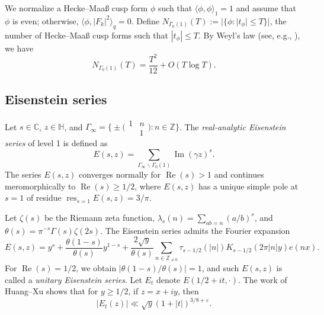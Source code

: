 \documentclass[12pt,reqno]{amsart}
\theoremstyle{remark}
\newcommand{\z}{\mathbb{Z}}
\newcommand{\bs}{\backslash}
\DeclareMathOperator{\Real}{Re}
\DeclareMathOperator{\Imag}{Im}
\DeclareMathOperator{\res}{res}
\numberwithin{equation}{section}
\begin{document}
    We normalize a Hecke--Maa{\ss} cusp form $\phi$ such that $\langle \phi, \phi \rangle_1= 1$ and assume that $\phi$ is  even; otherwise, $\langle \phi, |F_k|^2 \rangle_q = 0$. Define $N_{\Gamma_0(1)}(T) := |\{\phi :|t_\phi| \le T\}|$, the number of Hecke--Maa{\ss} cusp forms such that $|t_\phi| \le T$. By Weyl's law (see, e.g., \cite[Corollary 11.2]{Iw}), we have
        \begin{equation}
        \label{eq:Weyls}
            N_{\Gamma_0(1)}(T) = \frac{T^2}{12} + O(T\log T).
         \end{equation}

 
	\subsection{Eisenstein series}\label{subsec:Eisenstein}
	Let $s \in \mathbb{C}$, $z \in \mathbb{H}$, and $\Gamma_{\infty} = \big\{\pm \big(\begin{smallmatrix} 1 & n\\ & 1 \end{smallmatrix}\big): n \in \z \big\}$. The \textit{real-analytic Eisenstein series} of level 1 is defined as 
 \[
 E(s,z) = \sum_{\Gamma_\infty \bs \Gamma_0(1)} \Imag(\gamma z)^s.
 \]
 The series $E(s,z)$ converges normally for $\Real(s) >1$ and continues meromorphically to  $\Real(s) \ge 1/2$, where $E(s,z)$ has a unique simple pole  at $s=1$ of residue $\res_{s=1} E(s,z) = 3/\pi$. 

 
 
 Let $\zeta(s)$ be the Riemann zeta function,  $\lambda_s(n) = \sum_{ab=n}(a/b)^s$, and $\theta(s)=\pi^{-s}\Gamma(s)\zeta(2s)$.  The Eisenstein series admits the Fourier expansion 
	\[
	E(s,z) = y^s + \frac{\theta(1-s)}{\theta(s)}y^{1-s} +\frac{2\sqrt{y}}{\theta(s)}\sum_{n \in \mathbb{Z}_{\neq 0}}\tau_{s-1/2}(|n|)K_{s-1/2}(2\pi|n|y)e(nx).
	\]
	For $\Real(s) = 1/2$, we obtain $|\theta(1-s)/\theta(s)| =1$, and such $E(s,z)$ is called a \textit{unitary Eisenstein series}. Let $E_t$ denote $E(1/2+it, \cdot)$.  The work of Huang--Xu \cite[Theorem 1]{HX} shows that for $y\ge 1/2$, if $z = x+iy$, then
	\begin{equation}\label{eq:Huang-xu-bound}
		|E_t(z)|  \ll \sqrt{y}(1+|t|)^{3/8 + \varepsilon}.
	\end{equation}
       
\end{document}
